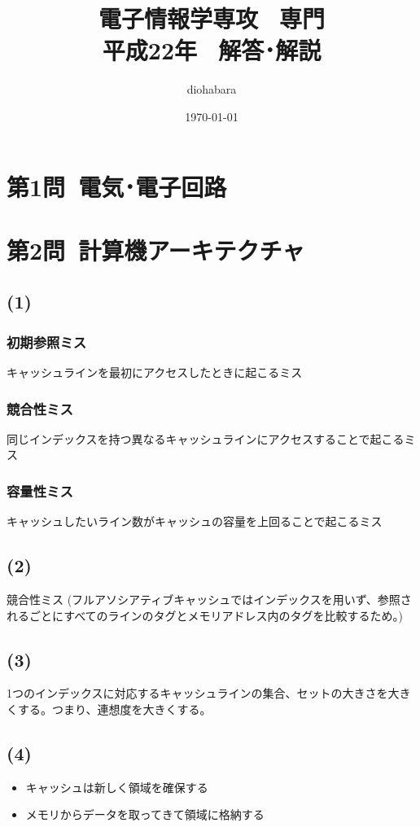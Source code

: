 \documentclass[a4paper,12pt,xelatex,ja=standard]{bxjsarticle}
\title{電子情報学専攻 \, 専門 \\ 平成22年 \, 解答･解説}
\author{diohabara}
\date{\today}
\begin{document}
\maketitle

\section*{第1問\ 電気･電子回路}

\section*{第2問\ 計算機アーキテクチャ}
\subsection*{(1)}
\subsubsection*{初期参照ミス}
キャッシュラインを最初にアクセスしたときに起こるミス

\subsubsection*{競合性ミス}
同じインデックスを持つ異なるキャッシュラインにアクセスすることで起こるミス

\subsubsection*{容量性ミス}
キャッシュしたいライン数がキャッシュの容量を上回ることで起こるミス

\subsection*{(2)}
競合性ミス
(フルアソシアティブキャッシュではインデックスを用いず、参照されるごとにすべてのラインのタグとメモリアドレス内のタグを比較するため。)

\subsection*{(3)}
1つのインデックスに対応するキャッシュラインの集合、セットの大きさを大きくする。つまり、連想度を大きくする。

\subsection*{(4)}
\begin{itemize}
  \item キャッシュは新しく領域を確保する
  \item メモリからデータを取ってきて領域に格納する
\end{itemize}
\end{document}
